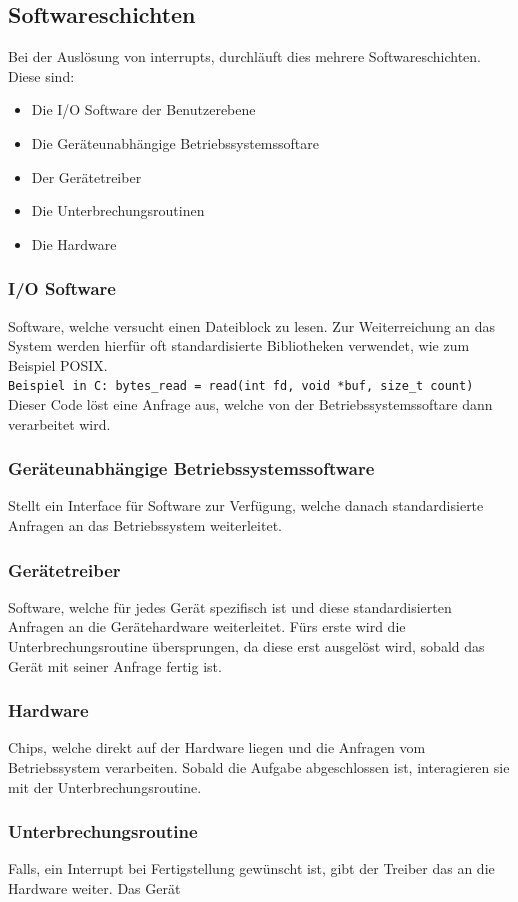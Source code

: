 \documentclass{article}
\begin{document}
	\subsection{Softwareschichten}
	Bei der Auslösung von interrupts, durchläuft dies mehrere Softwareschichten. Diese sind:
	\begin{itemize}
		\item{Die I/O Software der Benutzerebene}
		\item{Die Geräteunabhängige Betriebssystemssoftare}
		\item{Der Gerätetreiber}
		\item{Die Unterbrechungsroutinen}
		\item{Die Hardware}
	\end{itemize}
	\subsubsection{I/O Software}
	Software, welche versucht einen Dateiblock zu lesen. Zur Weiterreichung an das System werden hierfür oft standardisierte Bibliotheken verwendet, wie zum Beispiel POSIX. \\
	\verb|Beispiel in C: bytes_read = read(int fd, void *buf, size_t count)| \\
	Dieser Code löst eine Anfrage aus, welche von der Betriebssystemssoftare dann verarbeitet wird.
	\subsubsection{Geräteunabhängige Betriebssystemssoftware}
	Stellt ein Interface für Software zur Verfügung, welche danach standardisierte Anfragen an das Betriebssystem weiterleitet.
	\subsubsection{Gerätetreiber}
	Software, welche für jedes Gerät spezifisch ist und diese standardisierten Anfragen an die Gerätehardware weiterleitet. Fürs erste wird die Unterbrechungsroutine übersprungen, da diese erst ausgelöst wird, sobald das Gerät mit seiner Anfrage fertig ist.
	\subsubsection{Hardware}
	Chips, welche direkt auf der Hardware liegen und die Anfragen vom Betriebssystem verarbeiten. Sobald die Aufgabe abgeschlossen ist, interagieren sie mit der Unterbrechungsroutine.
	\subsubsection{Unterbrechungsroutine}
	Falls, ein Interrupt bei Fertigstellung gewünscht ist, gibt der Treiber das an die Hardware weiter. Das Gerät
\end{document}
